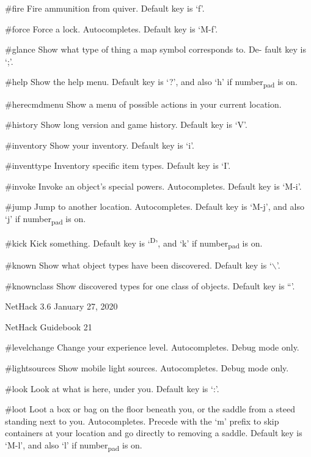 \documentclass[11pt]{article}
\begin{document}
\#fire
   Fire ammunition from quiver. Default key is `f'.

\#force
   Force a lock. Autocompletes. Default key is `M-f'.

\#glance
   Show what type of thing a map symbol corresponds to. De-
   fault key is `;'.

\#help
   Show the help menu. Default key is `?', and also `h' if
   number\textsubscript{pad} is on.

\#herecmdmenu
   Show a menu of possible actions in your current location.

\#history
   Show long version and game history. Default key is `V'.

\#inventory
   Show your inventory. Default key is `i'.

\#inventtype
   Inventory specific item types. Default key is `I'.

\#invoke
   Invoke an object's special powers. Autocompletes. Default
   key is `M-i'.

\#jump
   Jump to another location. Autocompletes.  Default key is
   `M-j', and also `j' if number\textsubscript{pad} is on.

\#kick
   Kick something. Default key is `\textsuperscript{D}', and `k' if number\textsubscript{pad}
   is on.

\#known
   Show what object types have been discovered. Default key is
   `$\backslash$'.

\#knownclass
   Show discovered types for one class of objects. Default key
   is ``'.



NetHack 3.6                   January 27, 2020





NetHack Guidebook                       21



\#levelchange
   Change your experience level.  Autocompletes.  Debug mode
   only.

\#lightsources
   Show mobile light sources. Autocompletes. Debug mode only.

\#look
   Look at what is here, under you. Default key is `:'.

\#loot
   Loot a box or bag on the floor beneath you, or the saddle
   from a steed standing next to you. Autocompletes.  Precede
   with the `m' prefix to skip containers at your location and
   go directly to removing a saddle. Default key is `M-l', and
   also `l' if number\textsubscript{pad} is on.
\end{document}
